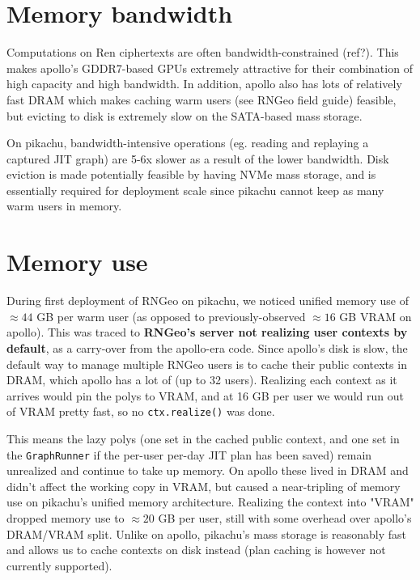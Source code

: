 \documentclass{article}
\begin{document}
\section{Memory bandwidth}
Computations on Ren ciphertexts are often bandwidth-constrained (ref?). 
This makes apollo's GDDR7-based GPUs extremely attractive for their combination of high capacity and high bandwidth.
In addition, apollo also has lots of relatively fast DRAM which makes caching warm users (see RNGeo field guide) feasible, but evicting to disk is extremely slow on the SATA-based mass storage.

On pikachu, bandwidth-intensive operations (eg. reading and replaying a captured JIT graph) are 5-6x slower as a result of the lower bandwidth.
Disk eviction is made potentially feasible by having NVMe mass storage, and is essentially required for deployment scale since pikachu cannot keep as many warm users in memory.

\vspace{0.2cm}
\noindent{}

\section{Memory use}
During first deployment of RNGeo on pikachu, we noticed unified memory use of $\approx 44$ GB per warm user (as opposed to previously-observed $\approx 16$ GB VRAM on apollo).
This was traced to \textbf{RNGeo's server not realizing user contexts by default}, as a carry-over from the apollo-era code.
Since apollo's disk is slow, the default way to manage multiple RNGeo users is to cache their public contexts in DRAM, which apollo has a lot of (up to 32 users).
Realizing each context as it arrives would pin the polys to VRAM, and at 16 GB per user we would run out of VRAM pretty fast, so no \verb|ctx.realize()| was done.

This means the lazy polys (one set in the cached public context, and one set in the \verb|GraphRunner| if the per-user per-day JIT plan has been saved) remain unrealized and continue to take up memory.
On apollo these lived in DRAM and didn't affect the working copy in VRAM, but caused a near-tripling of memory use on pikachu's unified memory architecture.
Realizing the context into "VRAM" dropped memory use to $\approx 20$ GB per user, still with some overhead over apollo's DRAM/VRAM split.
Unlike on apollo, pikachu's mass storage is reasonably fast and allows us to cache contexts on disk instead (plan caching is however not currently supported).
\end{document}
